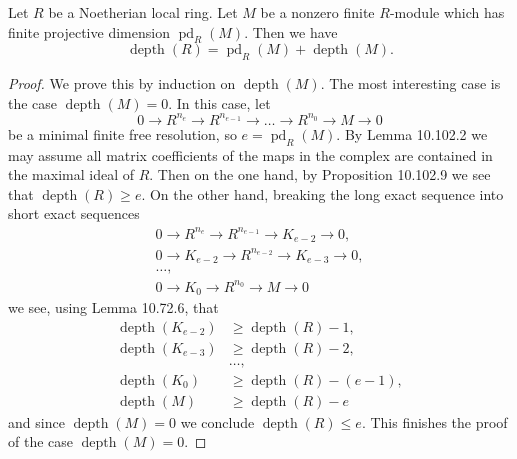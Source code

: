 \begin{proposition}
Let $R$ be a Noetherian local ring. Let $M$ be a nonzero finite $R$-module which has finite projective dimension $\operatorname{pd}_R(M)$. Then we have
\[
\operatorname{depth}(R)=\operatorname{pd}_R(M)+\operatorname{depth}(M).
\]
\end{proposition}
\begin{proof}
We prove this by induction on $\operatorname{depth}(M)$. The most interesting case is the case $\operatorname{depth}(M)=0$. In this case, let
\[
0\to R^{n_e}\to R^{n_{e-1}}\to\ldots\to R^{n_0}\to M\to0
\]
be a minimal finite free resolution, so $e=\operatorname{pd}_R(M)$. By Lemma 10.102.2 we may assume all matrix coefficients of the maps in the complex are contained in the maximal ideal of $R$. Then on the one hand, by Proposition 10.102.9 we see that $\operatorname{depth}(R)\geq e$. On the other hand, breaking the long exact sequence into short exact sequences
\begin{align*}
0\to R^{n_e}\to R^{n_{e-1}}\to K_{e-2}\to0,\\
0\to K_{e-2}\to R^{n_{e-2}}\to K_{e-3}\to0,\\
\ldots,\\
0\to K_0\to R^{n_0}\to M\to0
\end{align*}
we see, using Lemma 10.72.6, that
\begin{align*}
\operatorname{depth}(K_{e-2})&\geq\operatorname{depth}(R)-1,\\
\operatorname{depth}(K_{e-3})&\geq\operatorname{depth}(R)-2,\\
&\ldots,\\
\operatorname{depth}(K_0)&\geq\operatorname{depth}(R)-(e-1),\\
\operatorname{depth}(M)&\geq\operatorname{depth}(R)-e
\end{align*}
and since $\operatorname{depth}(M)=0$ we conclude $\operatorname{depth}(R)\leq e$. This finishes the proof of the case $\operatorname{depth}(M)=0$.


\end{proof}
